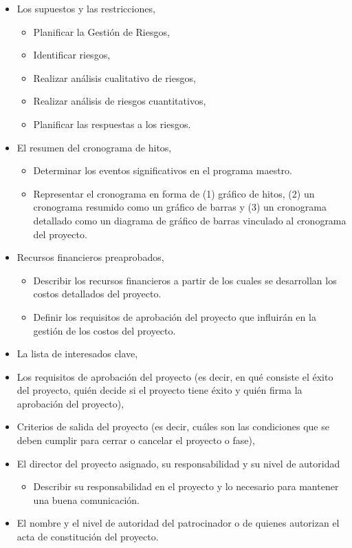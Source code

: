 \documentclass[letterpaper,12pt,openright,oneside]{article}
\theoremstyle{plain}
\begin{document}
\begin{itemize}
\begin{itemize}
        \end{itemize}
    \item Los supuestos y las restricciones,
        \begin{itemize}
            \item Planificar la Gestión de Riesgos,
            \item Identificar riesgos,
            \item Realizar análisis cualitativo de riesgos,
            \item Realizar análisis de riesgos cuantitativos,
            \item Planificar las respuestas a los riesgos.
        \end{itemize}
    \item El resumen del cronograma de hitos,
        \begin{itemize}
            \item Determinar los eventos significativos en el programa maestro.
            \item Representar el cronograma en forma de (1) gráfico de hitos, (2) un cronograma resumido como un gráfico de barras y (3) un cronograma detallado como un diagrama de gráfico de barras vinculado al cronograma del proyecto.
        \end{itemize}
    \item Recursos financieros preaprobados,
        \begin{itemize}
            \item Describir los recursos financieros a partir de los cuales se desarrollan los costos detallados del proyecto. 
            \item Definir los requisitos de aprobación del proyecto que influirán en la gestión de los costos del proyecto.
        \end{itemize}
    \item La lista de interesados clave,
    \item Los requisitos de aprobación del proyecto (es decir, en qué consiste el éxito del proyecto, quién decide si el proyecto tiene éxito y quién firma la aprobación del proyecto),
    \item Criterios de salida del proyecto (es decir, cuáles son las condiciones que se deben cumplir para cerrar o cancelar el proyecto o fase),
    \item El director del proyecto asignado, su responsabilidad y su nivel de autoridad
        \begin{itemize}
            \item Describir su responsabilidad en el proyecto y lo necesario para mantener una buena comunicación.
        \end{itemize}
    \item El nombre y el nivel de autoridad del patrocinador o de quienes autorizan el acta de constitución del proyecto.
\end{itemize}
\end{document}
